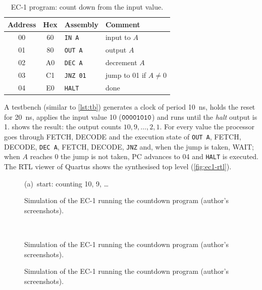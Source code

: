 \begin{table}[htbp]
\centering
\caption{EC-1 program: count down from the input value.}
\label{tab:ec1-prog}
\begin{tabular}{ccll}
\toprule Address & Hex & Assembly & Comment\\ \midrule
00 & 60 & \texttt{IN A} & input to $A$\\
01 & 80 & \texttt{OUT A} & output $A$\\
02 & A0 & \texttt{DEC A} & decrement $A$\\
03 & C1 & \texttt{JNZ 01} & jump to 01 if $A\ne0$\\
04 & E0 & \texttt{HALT} & done\\ \bottomrule
\end{tabular}
\end{table}

A testbench (similar to \cref{lst:tb}) generates a clock of period 10~ns, holds the reset for 20~ns, applies the input value 10 ($\mathtt{00001010}$) and runs until the \textit{halt} output is 1.  shows the result: the output counts $10,9,\dots,2,1$. For every value the processor goes through FETCH, DECODE and the execution state of \texttt{OUT A}, FETCH, DECODE, \texttt{DEC A}, FETCH, DECODE, \texttt{JNZ} and, when the jump is taken, WAIT; when $A$ reaches 0 the jump is not taken, PC advances to 04 and \texttt{HALT} is executed. The RTL viewer of Quartus shows the synthesised top level (\cref{fig:ec1-rtl}).

\begin{figure}[htbp]
\centering
{\small (a)~start: counting 10, 9, \dots}\\[3pt]
\caption{Simulation of the EC-1 running the countdown program (author's screenshots).}
\label{fig:ec1-sim}
\end{figure}

\begin{figure}[htbp]
\centering
\ContinuedFloat
{}
\vspace{4pt}{\small (b)~end: \dots, 2, 1 and halt}\\[3pt]
\caption[]{Simulation of the EC-1 running the countdown program (author's screenshots).}
\end{figure}

\begin{figure}[htbp]
\centering
\ContinuedFloat
{}
\caption[]{Simulation of the EC-1 running the countdown program (author's screenshots).}
\end{figure}

